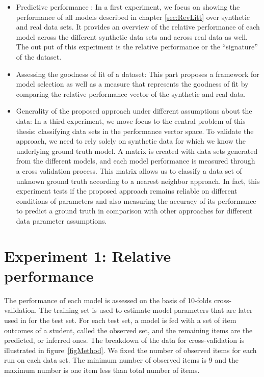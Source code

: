 \begin{itemize}
\item Predictive performance : In a first experiment, we focus on showing the performance of all models described in chapter \ref{sec:RevLitt} over synthetic and real data sets.  It provides an overview of the relative performance of each model across the different synthetic data sets and across real data as well. The out put of this experiment is the relative performance or the ``signature'' of the dataset.
\item Assessing the goodness of fit of a dataset: This part proposes a framework for model selection as well as a measure that represents the goodness of fit by comparing the relative performance vector of the synthetic and real data.
\item Generality of the proposed approach under different assumptions about the data: In a third experiment, we move focus to the central problem of this thesis: classifying data sets in the performance vector space.  To validate the approach, we need to rely solely on synthetic data for which we know the underlying ground truth model.  A matrix is created with data sets generated from the different models, and each model performance is measured through a cross validation process.  This matrix allows us to classify a data set of unknown ground truth according to a nearest neighbor approach. In fact, this experiment tests if the proposed approach remains reliable on different conditions of parameters and also measuring the accuracy of its performance to predict a ground truth in comparison with other approaches for different data parameter assumptions.
\end{itemize}

 


\section{Experiment 1: Relative performance}

The performance of each model is assessed on the basis of 10-folds cross-validation.  The training set is used to estimate model parameters that are later used in for the test set. For each test set, a model is fed with a set of item outcomes of a student, called the observed set, and the remaining items are the predicted, or inferred ones. The breakdown of the data for cross-validation is illustrated in figure~\ref{figMethod}. We fixed the number of observed items for each run on each data set. The minimum number of observed items is 9 and the maximum number is one item less than total number of items. 

